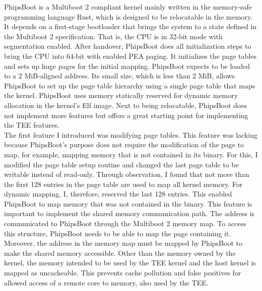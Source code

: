 PhipsBoot is a Multiboot 2 compliant kernel mainly written in the memory-safe
programming language Rust, which is designed to be relocatable in the memory. It
depends on a first-stage bootloader that brings the system to a state defined in the Multiboot 2
specification. That is, the CPU is in 32-bit mode with segmentation enabled.
After handover, PhipsBoot does all initialization steps to bring the CPU into
64-bit with enabled PEA paging. It initializes the page tables and sets up huge
pages for the initial mapping. PhipsBoot expects to be loaded to a 2 MiB-aligned
address. Its small size, which is less than 2 MiB, allows PhipsBoot to set up
the page table hierarchy using a single page table that maps the kernel.
PhipsBoot uses memory statically reserved for dynamic memory allocation in the
kernel's Elf image. Next to being relocatable, PhipsBoot does not implement more
features but offers a great starting point for implementing the TEE features. \\

The first feature I introduced was modifying page tables. This feature was
lacking because PhipsBoot's purpose does not require the modification of the
page to map, for example, mapping memory that is not contained in its binary.
For this, I modified the page table setup routine and changed the last page
table to be writable instead of read-only. Through observation, I found that not
more than the first 128 entries in the page table are used to map all kernel
memory. For dynamic mapping, I, therefore, reserved the last 128 entries. This
enabled PhipsBoot to map memory that was not contained in the binary. This
feature is important to implement the shared memory communication path. The
address is communicated to PhipsBoot through the Multiboot 2 memory map. To
access this structure, PhipsBoot needs to be able to map the page containing it.
Moreover, the address in the memory map must be mapped by PhipsBoot to make the
shared memory accessible. Other than the memory owned by the kernel, the memory
intended to be used by the TEE kernel and the host kernel is mapped as
uncacheable. This prevents cache pollution and false positives for allowed
access of a remote core to memory, also used by the TEE.\\

